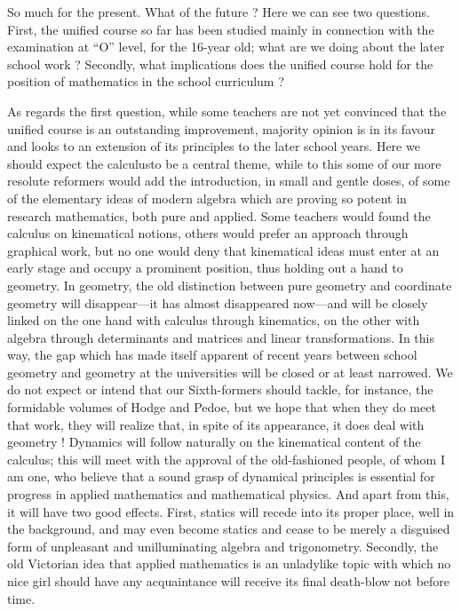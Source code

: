 So much for the present. What of the future ? Here we can see two questions. First, the unified course so far has been studied mainly in connection with the examination at ``O'' level, for the 16-year old; what are we doing about the later school work ? Secondly, what implications does the unified course hold for the position of mathematics in the school curriculum ?

As regards the first question, while some teachers are not yet convinced that the unified course is an outstanding improvement, majority opinion is in its favour and looks to an extension of its principles to the later school years. Here we should expect the calculus\pageoriginale to be a central theme, while to this some of our more resolute reformers would add the introduction, in small and gentle doses, of some of the elementary ideas of modern algebra which are proving so potent in research mathematics, both pure and applied. Some teachers would found the calculus on kinematical notions, others would prefer an approach through graphical work, but no one would deny that kinematical ideas must enter at an early stage and occupy a prominent position, thus holding out a hand to geometry. In geometry, the old distinction between pure geometry and coordinate geometry will disappear---it has almost disappeared now---and will be closely linked on the one hand with calculus through kinematics, on the other with algebra through determinants and matrices and linear transformations. In this way, the gap which has made itself apparent of recent years between school geometry and geometry at the universities will be closed or at least narrowed. We do not expect or intend that our Sixth-formers should tackle, for instance, the formidable volumes of Hodge and Pedoe, but we hope that when they do meet that work, they will realize that, in spite of its appearance, it does deal with geometry ! Dynamics will follow naturally on the kinematical content of the calculus; this will meet with the approval of the old-fashioned people, of whom I am one, who believe that a sound grasp of dynamical principles is essential for progress in applied mathematics and mathematical physics. And apart from this, it will have two good effects. First, statics will recede into its proper place, well in the background, and may even become statics and cease to be merely a disguised form of unpleasant and unilluminating algebra and trigonometry. Secondly, the old Victorian idea that applied mathematics is an unladylike topic with which no nice girl should have any acquaintance will receive its final death-blow not before time.

